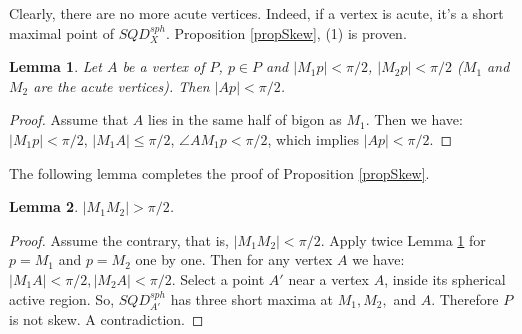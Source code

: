\documentclass[12pt]{amsart}
\newtheorem{lemma}{Lemma}
\newtheorem*{main lemma}{The main lemma}
\begin{document}
Clearly, there are no more acute vertices. Indeed, if a vertex is acute, it's a short maximal point of $SQD^{sph}_X$. Proposition \ref{propSkew}, (1) is proven.


\begin{lemma}\label{onetimes}
    Let $A$ be a vertex of $P$, $p\in P$ and $|M_1p|<\pi/2$, $|M_2p|<\pi/2$ ($M_1$ and $M_2$ are  the acute vertices). Then $|Ap|<\pi/2$.
\end{lemma}

\begin{proof}
     Assume that $A$ lies in the same half of bigon as $M_1$. Then we have:$|M_1p|<\pi/2$, $|M_1A|\leqslant \pi/2$, $\angle AM_1p<\pi/2$, which implies $|Ap|<\pi/2$.
\end{proof}


The following lemma completes the proof  of  Proposition \ref{propSkew}.

\begin{lemma}
    $|M_1M_2|>\pi/2$.
\end{lemma}

\begin{proof}
    Assume the contrary, that is, $|M_1M_2|<\pi/2$. Apply twice Lemma \ref{onetimes} for $p = M_1$ and $p = M_2$ one by one. Then for any vertex $A$ we have: $|M_1A|<\pi/2, |M_2A|<\pi/2$. Select a point $A'$ near a vertex $A$, inside its spherical active region. So, $SQD^{sph}_{A'}$ has three short maxima at $M_1, M_2,$ and  $ A$. Therefore $P$ is not skew. A contradiction.
\end{proof}
\end{document}
